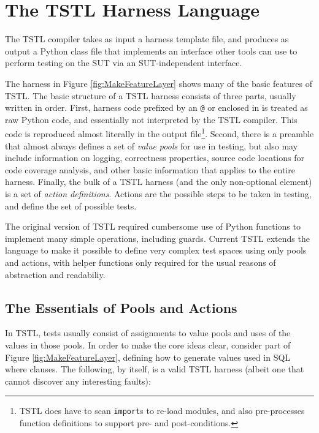 \section{The TSTL Harness Language}

The TSTL compiler takes as input a harness template file, and produces
as output a Python class file that implements an interface other tools
can use to perform testing on the SUT via an SUT-independent interface.

The harness in Figure \ref{fig:MakeFeatureLayer} shows many of the
basic features of TSTL.  The basic structure of a TSTL harness
consists of three parts, usually written in order.  First, harness
code prefixed by an {\tt @} or enclosed in {\tt <@ @>} is treated as
raw Python code, and essentially not interpreted by the TSTL
compiler.  This code is reproduced almost literally in the output
file\footnote{TSTL does have to scan {\tt import}s to re-load modules, and also pre-processes function
  definitions to support
pre- and post-conditions.}.  Second, there is a preamble that almost
always defines a set of \emph{value pools} for use in testing, but
also may include information on logging, correctness properties,
source code locations for code coverage analysis, and other basic
information that applies to the entire harness.  Finally, the bulk of
a TSTL harness (and the only non-optional element) is a set of
\emph{action definitions}.  Actions are the possible steps to be taken in
testing, and define the set of possible tests.

The original version of TSTL \cite{NFM15} required cumbersome use of Python
functions to implement many simple operations, including guards.  Current TSTL extends
the language to make it possible to define very complex test spaces
using only pools and actions, with helper functions only required for
the usual reasons of abstraction and readabiliy.

\subsection{The Essentials of Pools and Actions}

In TSTL, tests usually consist of assignments to value pools and uses of the
values in those pools.  In order to make the core ideas clear,
consider part of Figure \ref{fig:MakeFeatureLayer}, defining how to
generate values used in SQL where clauses.  The following, by itself,
is a valid TSTL harness (albeit one that cannot discover any
interesting faults):

